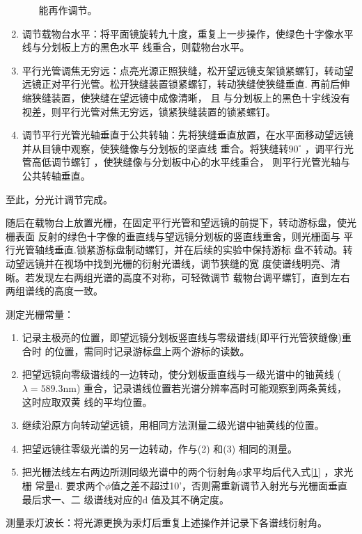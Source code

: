 \documentclass[dvipsnames, svgnames,a4paper,11pt]{article}
\begin{document}
\begin{enumerate}
\begin{enumerate}
		能再作调节。
	\end{enumerate}
	\item 调节载物台水平：将平面镜旋转九十度，重复上一步操作，使绿色十字像水平线与分划板上方的黑色水平
		线重合，则载物台水平。
	\item 平行光管调焦无穷远：点亮光源正照狭缝，松开望远镜支架锁紧螺钉，转动望远镜正对平行光管。松开狭缝装置锁紧螺钉，转动狭缝使狭缝垂直. 再前后伸缩狭缝装置，使狭缝在望远镜中成像清晰， 且
	与分划板上的黑色十宇线没有视差，则平行光管对焦无穷远，锁紧狭缝装置的锁紧螺钉。
	\item 调节平行光管光轴垂直于公共转轴：先将狭缝垂直放置，在水平面移动望远镜并从目镜中观察，使狭缝像与分划板的坚直线
	重合。将狭缝转$90^\circ$ ，调平行光管高低调节螺钉 ，使狭缝像与分划板中心的水平线重合，
	则平行光管光轴与公共转轴垂直。
\end{enumerate}
至此，分光计调节完成。

随后在载物台上放置光栅，在固定平行光管和望远镜的前提下，转动游标盘，使光栅表面
反射的绿色十字像的垂直线与望远镜分划板的竖直线重舍，则光栅面与
平行光管轴线垂直.锁紧游标盘制动螺钉，并在后续的实验中保持游标
盘不转动。转动望远镜并在视场中找到光栅的衍射光谱线，调节狭缝的宽
度使谱线明亮、清晰。若发现左右两组光谱的高度不对称，可轻微调节
载物台调平螺钉，直到左右两组谱线的高度一致。

测定光栅常量：\begin{enumerate}
	\item 记录主极亮的位置，即望远镜分划板竖直线与零级谱线(即平行光管狭缝像)重合时
	的位置，需同时记录游标盘上两个游标的读数。
	\item 把望远镜向零级谱线的一边转动，使分划板垂直线与一级光谱中的铀黄线
	($\lambda=589.3$nm) 重合，记录谱线位置若光谱分辨率高时可能观察到两条黄线，这时应取双黄
	线的平均位置。
	\item 继续沿原方向转动望远镜，用相同方法测量二级光谱中铀黄线的位置。
	\item 把望远镜往零级光谱的另一边转动，作与(2) 和(3) 相同的测量。
	\item 把光栅法线左右两边所测同级光谱中的两个衍射角$\phi$求平均后代入式\ref{1} ，求光栅
	常量d. 要求两个$\phi$值之差不超过10'，否则需重新调节入射光与光栅面垂直最后求一、二
	级谱线对应的d 值及其不确定度。
\end{enumerate}

测量汞灯波长：将光源更换为汞灯后重复上述操作并记录下各谱线衍射角。
\end{document}
